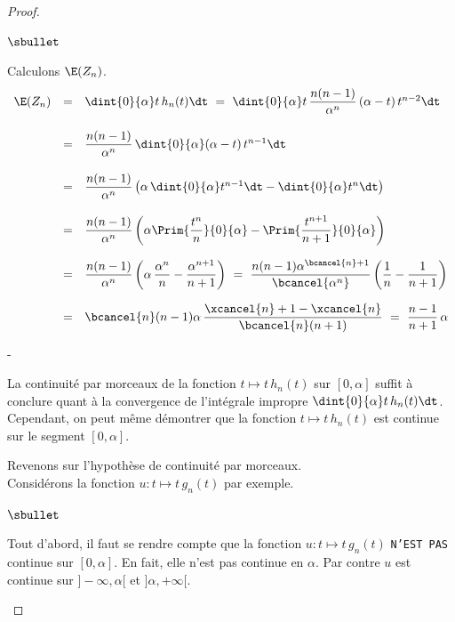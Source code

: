 \begin{proof}
\begin{noliste}{$\sbullet$}
	
	\item Calculons $\E(Z_n)$.
	\[
	  \begin{array}{rcl}
	    \E(Z_n) & = & \dint{0}{\alpha} t \, h_n(t) \dt \ = \
	    \dint{0}{\alpha} t \, \dfrac{n(n-1)}{\alpha^{n}} \,
	    (\alpha -t) \, t^{n-2} \dt
	    \\[.6cm]
	    & = & \dfrac{n(n-1)}{\alpha^{n}} \, \dint{0}{\alpha}
	    (\alpha -t) \, t^{n-1} \dt
	    \\[.6cm]
	    & = & \dfrac{n(n-1)}{\alpha^n} \left(\alpha \, 
	    \dint{0}{\alpha} t^{n-1} \dt - \dint{0}{\alpha} t^n \dt
	    \right)
	    \\[.6cm]
	    & = & \dfrac{n(n-1)}{\alpha^n} \left(\alpha 
	    \Prim{\dfrac{t^n}{n}}{0}{\alpha} - \Prim{\dfrac{t^{n+1}}
	    {n+1}}{0}{\alpha} \right)
	    \\[.6cm]
	    & = & \dfrac{n(n-1)}{\alpha^n} \left( \alpha \, 
	    \dfrac{\alpha^n}{n} - \dfrac{\alpha^{n+1}}{n+1} \right)
	    \ = \ \dfrac{n(n-1)\alpha^{\bcancel{n}+1}}
	    {\bcancel{\alpha^n}}\left(\dfrac{1}{n} - \dfrac{1}{n+1}
	    \right)
	    \\[.6cm]
	    & = & \bcancel{n}(n-1) \alpha \, \dfrac{\xcancel{n} +1
	    -\xcancel{n}}{\bcancel{n}(n+1)}
	    \ = \ \dfrac{n-1}{n+1} \, \alpha
	  \end{array}
	\]
      \end{noliste}
      
      \begin{remarkL}{.97}%
      \begin{noliste}{-}
        \item La continuité par morceaux de la fonction $t \mapsto 
        t \, h_n(t)$ sur $[0,\alpha]$ suffit à conclure quant à la 
	convergence de l'intégrale impropre $\dint{0}{\alpha}
	t \, h_n(t) \dt$.\\
	Cependant, on peut même démontrer que la 
	fonction $t \mapsto t \, h_n(t)$ est continue sur le segment 
	$[0,\alpha]$.
        
        \item Revenons sur l'hypothèse de continuité par morceaux.\\
        Considérons la fonction $u : t \mapsto t \, g_n(t)$ par exemple.
        \begin{noliste}{$\sbullet$}
        \item Tout d'abord, il faut se rendre compte que la fonction
          $u : t \mapsto t \, g_n(t)$ {\tt N'EST PAS} continue sur
          $[0, \alpha]$. En fait, elle n'est pas continue en
          $\alpha$. Par contre $u$ est continue sur
          $]-\infty, \alpha[$ et $]\alpha, +\infty[$.


\end{noliste}
\end{noliste}
\end{remarkL}
\end{proof}
